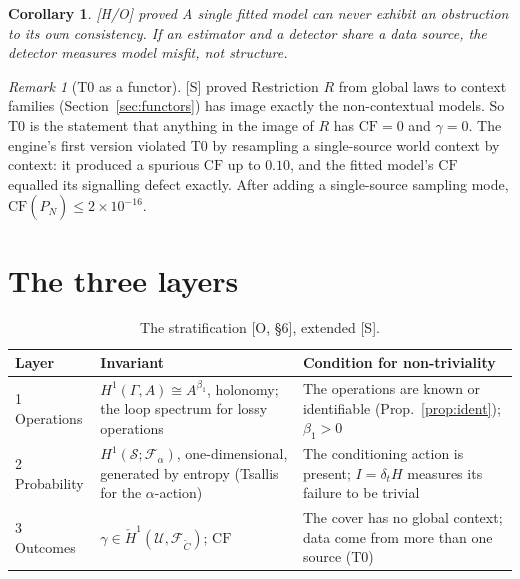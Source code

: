 \documentclass[11pt]{article}
\newtheorem{corollary}[theorem]{Corollary}
\theoremstyle{definition}
\theoremstyle{remark}
\newtheorem{remark}[theorem]{Remark}
\newcommand{\CF}{\mathrm{CF}}
\newcommand{\src}[1]{\textsf{\small[#1]}}
\newcommand{\st}[1]{\textsf{\small\color{gray}#1}}
\begin{document}
\begin{corollary}\label{cor:T0}
\src{H/O} \st{proved}
A single fitted model can never exhibit an obstruction to its own consistency. If an estimator and a detector share a data source, the detector measures model misfit, not structure.
\end{corollary}

\begin{remark}[T0 as a functor]
\src{S} \st{proved}
Restriction $R$ from global laws to context families (Section~\ref{sec:functors}) has image exactly the non-contextual models. So T0 is the statement that anything in the image of $R$ has $\CF=0$ and $\gamma=0$. The engine's first version violated T0 by resampling a single-source world context by context: it produced a spurious $\CF$ up to $0.10$, and the fitted model's $\CF$ equalled its signalling defect exactly. After adding a single-source sampling mode, $\CF(\hat P_N)\le2\times10^{-16}$.
\end{remark}

\section{The three layers}

\begin{table}[!htbp]\centering
\begin{tabularx}{\linewidth}{@{}l>{\raggedright}X>{\raggedright\arraybackslash}X@{}}
\toprule
Layer & Invariant & Condition for non-triviality\\
\midrule
1 Operations & $H^1(\Gamma,A)\cong A^{\beta_1}$, holonomy; the loop spectrum for lossy operations & The operations are known or identifiable (Prop.~\ref{prop:ident}); $\beta_1>0$\\
2 Probability & $H^1(\mathcal S;\mathcal F_\alpha)$, one-dimensional, generated by entropy (Tsallis for the $\alpha$-action) & The conditioning action is present; $I=\delta_tH$ measures its failure to be trivial\\
3 Outcomes & $\gamma\in\check H^1(\mathcal U,\mathcal F_{\tilde C})$; $\CF$ & The cover has no global context; data come from more than one source (T0)\\
\bottomrule
\end{tabularx}
\caption{The stratification \src{O, \S6}, extended \src{S}.}
\end{table}
\end{document}

